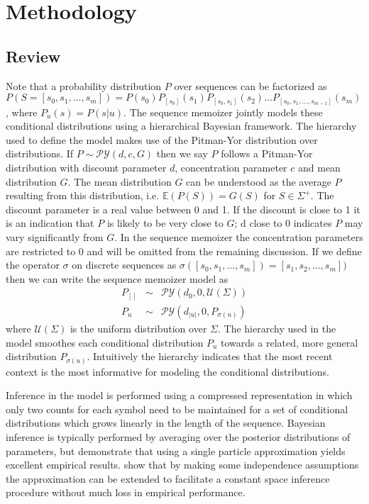 \section{Methodology}
\label{section:methodology}
\newcommand{\PY}{\ensuremath{\mathcal{P}\mathcal{Y}}}

\subsection{Review}

Note that a probability distribution $P$ over sequences can be factorized as $P(S = [s_0, s_1, \ldots, s_m]) = P(s_0)P_{[s_0]}(s_1)P_{[s_0,s_1]}(s_2) \ldots P_{[s_0,s_1,\ldots,s_{m-1}]}(s_m)$, where $P_u(s) = P(s | u)$.  The sequence memoizer jointly models these conditional distributions using a hierarchical Bayesian framework.  The hierarchy used to define the model makes use of the Pitman-Yor distribution over distributions. If $P \sim \PY(d,c,G)$ then we say $P$ follows a Pitman-Yor distribution with discount parameter $d$, concentration parameter $c$ and mean distribution $G$.  The mean distribution $G$ can be understood as the average $P$ resulting from this distribution, i.e. $\mathbb{E}(P(S)) = G(S)$ for $S \in \Sigma^{+}$.  The discount parameter is a real value between 0 and 1.  If the discount is close to 1 it is an indication that $P$ is likely to be very close to $G$; d close to 0 indicates $P$ may vary significantly from $G$.  In the sequence memoizer the concentration parameters are restricted to 0 and will be omitted from the remaining discussion. If we define the operator $\sigma$ on discrete sequences as $\sigma([s_0, s_1, \ldots, s_m]) = [s_1,s_2, \ldots, s_m])$ then we can write the sequence memoizer model as 
%
\begin{eqnarray*}
	P_{[ ]} &\sim& \PY(d_0,0,\mathcal{U}(\Sigma))\\
	P_{u} &\sim& \PY(d_{|u|}, 0, P_{\sigma(u)})
\end{eqnarray*}
\noindent where $\mathcal{U}(\Sigma)$ is the uniform distribution over $\Sigma$.  The hierarchy used in the model smoothes each conditional distribution $P_u$ towards a related, more general distribution $P_{\sigma(u)}$.  Intuitively the hierarchy indicates that the most recent context is the most informative for modeling the conditional distributions.

Inference in the model is performed using a compressed representation in which only two counts for each symbol need to be maintained for a set of conditional distributions which grows linearly in the length of the sequence.  Bayesian inference is typically performed by averaging over the posterior distributions of parameters, but \cite{Gasthaus2010} demonstrate that using a single particle approximation yields excellent empirical results. \cite{Bartlett2010}  show that by making some independence assumptions the approximation can be extended to facilitate a constant space inference procedure without much loss in  empirical performance.

